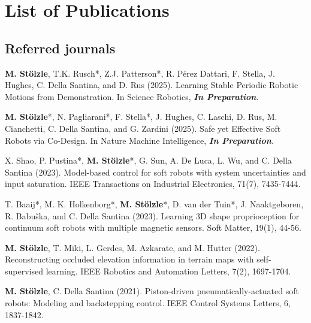 \chapter*{List of Publications}
\label{publications}

\section*{Referred journals}

\begin{enumerate}{
    \item[\faFileTextO \, \stepcounter{enumi}\arabic{enumi}.] \textbf{M. Stölzle}, T.K. Rusch*, Z.J. Patterson*, R. Pérez Dattari, F. Stella, J. Hughes, C. Della Santina, and D. Rus (2025). Learning Stable Periodic Robotic Motions from Demonstration. In Science Robotics, \textbf{\emph{In Preparation}}.
    \item[\faFileTextO \, \stepcounter{enumi}\arabic{enumi}.] \textbf{M. Stölzle}*, N. Pagliarani*, F. Stella*, J. Hughes, C. Laschi, D. Rus, M. Cianchetti, C. Della Santina, and G. Zardini (2025). Safe yet Effective Soft Robots via Co-Design. In Nature Machine Intelligence, \textbf{\emph{In Preparation}}.
    \item X. Shao, P. Pustina*, \textbf{M. Stölzle}*, G. Sun, A. De Luca, L. Wu, and C. Della Santina (2023). Model-based control for soft robots with system uncertainties and input saturation. IEEE Transactions on Industrial Electronics, 71(7), 7435-7444.
    \item[\faFileTextO \, \stepcounter{enumi}\arabic{enumi}.] T. Baaij*, M. K. Holkenborg*, \textbf{M. Stölzle}*, D. van der Tuin*, J. Naaktgeboren, R. Babuška, and C. Della Santina (2023). Learning 3D shape proprioception for continuum soft robots with multiple magnetic sensors. Soft Matter, 19(1), 44-56.
    \item \textbf{M. Stölzle}, T. Miki, L. Gerdes, M. Azkarate, and M. Hutter (2022). Reconstructing occluded elevation information in terrain maps with self-supervised learning. IEEE Robotics and Automation Letters, 7(2), 1697-1704.
    \item[\faFileTextO \, \stepcounter{enumi}\arabic{enumi}.] \textbf{M. Stölzle}, C. Della Santina (2021). Piston-driven pneumatically-actuated soft robots: Modeling and backstepping control. IEEE Control Systems Letters, 6, 1837-1842.
}\end{enumerate}


